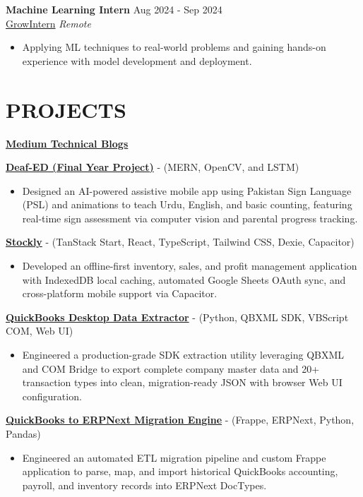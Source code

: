 \documentclass[11pt]{article}
\newcommand{\rSection}[1]{\section{\uppercase{#1}}}
\begin{document}
\textbf{Machine Learning Intern} \hfill {Aug 2024 - Sep 2024}\\
\href{https://drive.google.com/file/d/1kSknkHNtKaMFBr9z86mjjsjCe-7r7mOs/view?usp=drive_link}{GrowIntern} \hfill \textit{Remote}
 \begin{itemize}
    \item Applying ML techniques to real-world problems and gaining hands-on experience with model development and deployment.
 \end{itemize}

\rSection{Projects}

\faMedium{} \href{https://medium.com/@usmanamjad495}{\textbf{Medium Technical Blogs}}

\href{https://github.com/MaAn-41/Deaf-Ed}{\textbf{Deaf-ED (Final Year Project)}} - (MERN, OpenCV, and LSTM)  
\begin{itemize} 
  \item Designed an AI-powered assistive mobile app using Pakistan Sign Language (PSL) and animations to teach Urdu, English, and basic counting, featuring real-time sign assessment via computer vision and parental progress tracking.
\end{itemize}

\href{https://github.com/usmanagro7c-eng/Stockly}{\textbf{Stockly}} - (TanStack Start, React, TypeScript, Tailwind CSS, Dexie, Capacitor)  
\begin{itemize} 
  \item Developed an offline-first inventory, sales, and profit management application with IndexedDB local caching, automated Google Sheets OAuth sync, and cross-platform mobile support via Capacitor.
\end{itemize}

\href{https://github.com/tushar-javaid/QuickBook_Desktop_Data_Extractor}{\textbf{QuickBooks Desktop Data Extractor}} - (Python, QBXML SDK, VBScript COM, Web UI)  
\begin{itemize} 
  \item Engineered a production-grade SDK extraction utility leveraging QBXML and COM Bridge to export complete company master data and 20+ transaction types into clean, migration-ready JSON with browser Web UI configuration.
\end{itemize}

\href{https://github.com/MaAn-41}{\textbf{QuickBooks to ERPNext Migration Engine}} - (Frappe, ERPNext, Python, Pandas)  
\begin{itemize} 
  \item Engineered an automated ETL migration pipeline and custom Frappe application to parse, map, and import historical QuickBooks accounting, payroll, and inventory records into ERPNext DocTypes.
\end{itemize}
\end{document}
